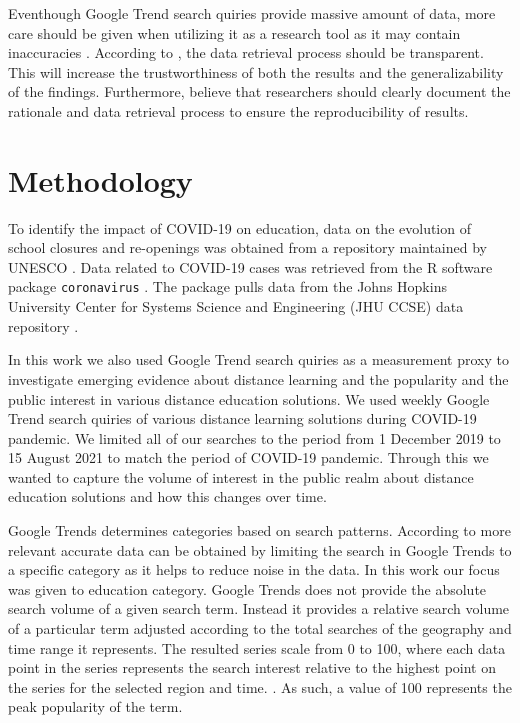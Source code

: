 \documentclass[11pt,a4paper,]{article}
\begin{document}
Eventhough Google Trend search quiries provide massive amount of data, more care should be given when utilizing it as a research tool as it may contain inaccuracies \autocite{carneiro2009google}. According to \textcite{nuti2014use}, the data retrieval process should be transparent. This will increase the trustworthiness of both the results and the generalizability of the findings. Furthermore, \textcite{nuti2014use} believe that researchers should clearly document the rationale and data retrieval process to ensure the reproducibility of results.

\hypertarget{methodology}{%
\section{Methodology}\label{methodology}}

To identify the impact of COVID-19 on education, data on the evolution of school closures and re-openings was obtained from a repository maintained by UNESCO \autocite{unesco2020covid}. Data related to COVID-19 cases was retrieved from the R software \autocite{rsoftware} package \texttt{coronavirus} \autocite{coronavirusr}. The package pulls data from the Johns
Hopkins University Center for Systems Science and Engineering (JHU CCSE) data repository \autocite{dong2020interactive}.

In this work we also used Google Trend search quiries as a measurement proxy to investigate emerging evidence about distance learning and the popularity and the public interest in various distance education solutions. We used weekly Google Trend search quiries of various distance learning solutions during COVID-19 pandemic. We limited all of our searches to the period from 1 December 2019 to 15 August 2021 to match the period of COVID-19 pandemic. Through this we wanted to capture the volume of interest in the public realm about distance education solutions and how this changes over time.

Google Trends determines categories based on search patterns. According to \textcite{vaughan2014web} more relevant accurate data can be obtained by limiting the search in Google Trends to a specific category as it helps to reduce noise in the data. In this work our focus was given to education category. Google Trends does not provide the absolute search volume of a given search term. Instead it provides a relative search volume of a particular term adjusted according to the total searches of the geography and time range it represents. The resulted series scale from 0 to 100, where each data point in the series represents the search interest relative to the highest point on the series for the selected region and time. \autocite{alicino2015assessing,vaughan2014web}. As such, a value of 100 represents the peak popularity of the term.
\end{document}
